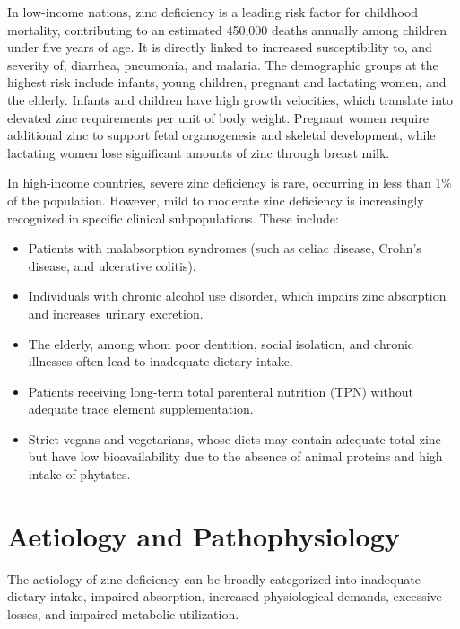 In low-income nations, zinc deficiency is a leading risk factor for childhood mortality, contributing to an estimated 450,000 deaths annually among children under five years of age. It is directly linked to increased susceptibility to, and severity of, diarrhea, pneumonia, and malaria. The demographic groups at the highest risk include infants, young children, pregnant and lactating women, and the elderly. Infants and children have high growth velocities, which translate into elevated zinc requirements per unit of body weight. Pregnant women require additional zinc to support fetal organogenesis and skeletal development, while lactating women lose significant amounts of zinc through breast milk.

In high-income countries, severe zinc deficiency is rare, occurring in less than 1\% of the population. However, mild to moderate zinc deficiency is increasingly recognized in specific clinical subpopulations. These include:
\begin{itemize}
    \item Patients with malabsorption syndromes (such as celiac disease, Crohn's disease, and ulcerative colitis).
    \item Individuals with chronic alcohol use disorder, which impairs zinc absorption and increases urinary excretion.
    \item The elderly, among whom poor dentition, social isolation, and chronic illnesses often lead to inadequate dietary intake.
    \item Patients receiving long-term total parenteral nutrition (TPN) without adequate trace element supplementation.
    \item Strict vegans and vegetarians, whose diets may contain adequate total zinc but have low bioavailability due to the absence of animal proteins and high intake of phytates.
\end{itemize}

\section*{Aetiology and Pathophysiology}
The aetiology of zinc deficiency can be broadly categorized into inadequate dietary intake, impaired absorption, increased physiological demands, excessive losses, and impaired metabolic utilization.

